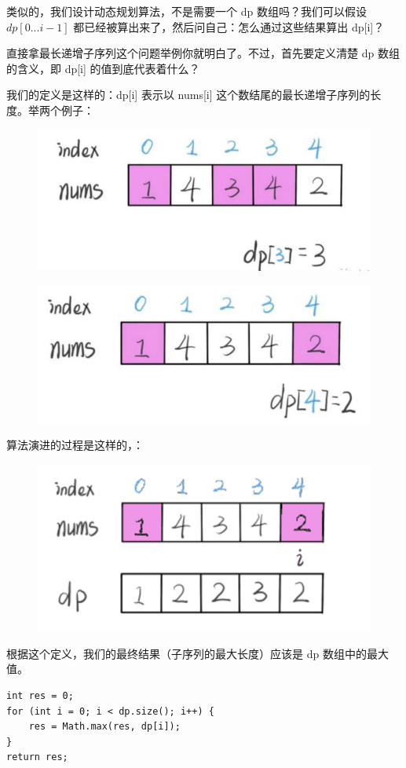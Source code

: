 \documentclass[12pt]{article}
\begin{document}
类似的，我们设计动态规划算法，不是需要一个 dp 数组吗？我们可以假设 $dp[0...i-1]$ 都已经被算出来了，然后问自己：怎么通过这些结果算出 dp[i]？

直接拿最长递增子序列这个问题举例你就明白了。不过，首先要定义清楚 dp 数组的含义，即 dp[i] 的值到底代表着什么？

我们的定义是这样的：dp[i] 表示以 nums[i] 这个数结尾的最长递增子序列的长度。举两个例子：
\begin{figure}[H]
    \centering
    \includegraphics[width=.8\textwidth]{fig/Dynamic_Programming_Longest_Increasing Subsequence_2.png}
\end{figure}
\begin{figure}[H]
    \centering
    \includegraphics[width=.8\textwidth]{fig/Dynamic_Programming_Longest_Increasing Subsequence_3.png}
\end{figure}

算法演进的过程是这样的，：
\begin{figure}[H]
    \centering
    \includegraphics[width=.4\textwidth]{fig/Dynamic_Programming_Longest_Increasing Subsequence_4.png}
\end{figure}

根据这个定义，我们的最终结果（子序列的最大长度）应该是 dp 数组中的最大值。
\begin{lstlisting}
int res = 0;
for (int i = 0; i < dp.size(); i++) {
    res = Math.max(res, dp[i]);
}
return res;
\end{lstlisting}
\end{document}
